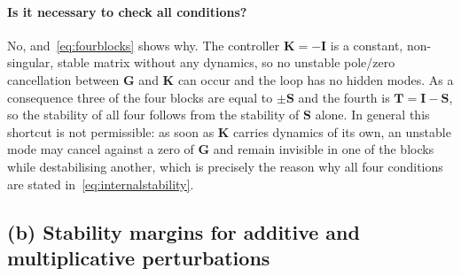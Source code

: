 \paragraph{Is it necessary to check all conditions?} No, and~\eqref{eq:fourblocks} shows why. The
controller $\mathbf{K}=-\mathbf{I}$ is a constant, non-singular, stable matrix without any
dynamics, so no unstable pole/zero cancellation between $\mathbf{G}$ and $\mathbf{K}$ can occur
and the loop has no hidden modes. As a consequence three of the four blocks are equal to
$\pm\mathbf{S}$ and the fourth is $\mathbf{T}=\mathbf{I}-\mathbf{S}$, so the stability of all
four follows from the stability of $\mathbf{S}$ alone. In general this shortcut is not
permissible: as soon as $\mathbf{K}$ carries dynamics of its own, an unstable mode may cancel
against a zero of $\mathbf{G}$ and remain invisible in one of the blocks while destabilising
another, which is precisely the reason why all four conditions are stated
in~\eqref{eq:internalstability}.

\subsection{(b) Stability margins for additive and multiplicative perturbations}

